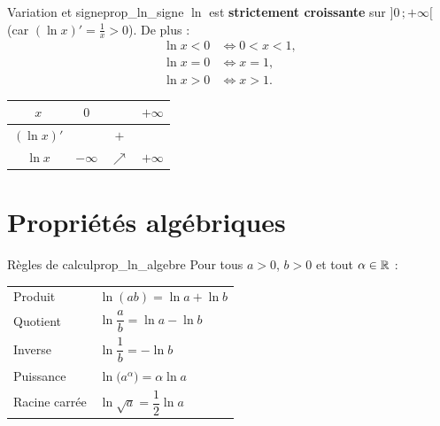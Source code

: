 \begin{propriete}{Variation et signe}{prop_ln_signe}
	$\ln$ est \textbf{strictement croissante} sur $]0\,;+\infty[$
	(car $(\ln x)'=\tfrac1x>0$). De plus :
	\[
	\begin{aligned}
	\ln x<0 &\iff 0<x<1,\\
	\ln x=0 &\iff x=1,\\
	\ln x>0 &\iff x>1.
	\end{aligned}
	\]
	\begin{center}
	\renewcommand{\arraystretch}{1.5}
	\setlength{\tabcolsep}{5pt}
	\begin{tabular}{c|ccc}
	$x$        & $0$       &            & $+\infty$ \\
	\hline
	$(\ln x)'$ &           & $+$        &           \\
	\hline
	$\ln x$    & $-\infty$ & $\nearrow$ & $+\infty$ \\
	\end{tabular}
	\end{center}
\end{propriete}

\begin{center}
\end{center}


\section{Propriétés algébriques}

\begin{propriete}{Règles de calcul}{prop_ln_algebre}
	Pour tous $a>0$, $b>0$ et tout $\alpha\in\mathbb{R}$ :
	\begin{center}
	\renewcommand{\arraystretch}{1.9}
	\begin{tabular}{>{\raggedright\arraybackslash}p{3.2cm}
	                >{\centering\arraybackslash}p{4.6cm}}
	\hline
	Produit          & $\ln(ab)=\ln a+\ln b$ \\
	Quotient         & $\ln\!\dfrac{a}{b}=\ln a-\ln b$ \\
	Inverse          & $\ln\!\dfrac{1}{b}=-\ln b$ \\
	Puissance        & $\ln\!\bigl(a^{\alpha}\bigr)=\alpha\ln a$ \\
	Racine carrée    & $\ln\sqrt{a}=\dfrac12\ln a$ \\
	\hline
	\end{tabular}
	\end{center}
\end{propriete}

